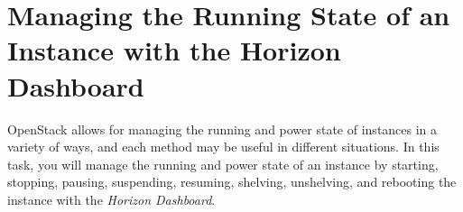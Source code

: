 \documentclass[letterpaper, 12pt]{article}
\begin{document}

\section{Managing the Running State of an Instance with the Horizon Dashboard}\label{sec:managing_the_running_state_of_an_instance_web}
OpenStack allows for managing the running and power state of instances in a variety of ways, and each method may be useful in different situations.
In this task, you will manage the running and power state of an instance by starting, stopping, pausing, suspending, resuming, shelving, unshelving, and rebooting the instance with the \textit{Horizon Dashboard}.
\end{document}

